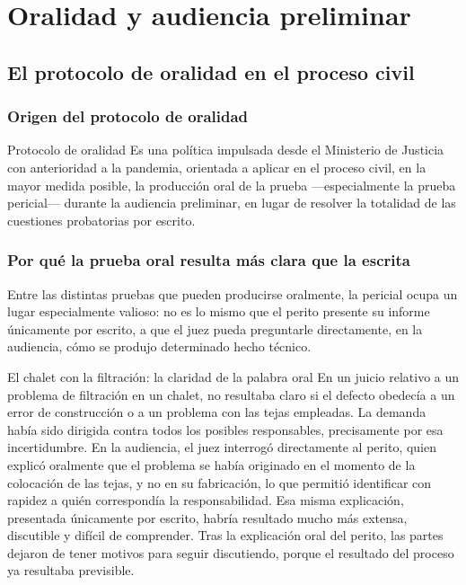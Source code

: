 \documentclass[12pt,oneside]{book}
\begin{document}
\chapter{Oralidad y audiencia preliminar}

\section{El protocolo de oralidad en el proceso civil}

\subsection{Origen del protocolo de oralidad}

\begin{definition}{Protocolo de oralidad}
Es una política impulsada desde el Ministerio de Justicia con anterioridad a la pandemia, orientada a aplicar en el proceso civil, en la mayor medida posible, la producción oral de la prueba —especialmente la prueba pericial— durante la audiencia preliminar, en lugar de resolver la totalidad de las cuestiones probatorias por escrito.
\end{definition}

\subsection{Por qué la prueba oral resulta más clara que la escrita}

Entre las distintas pruebas que pueden producirse oralmente, la pericial ocupa un lugar especialmente valioso: no es lo mismo que el perito presente su informe únicamente por escrito, a que el juez pueda preguntarle directamente, en la audiencia, cómo se produjo determinado hecho técnico.

\begin{example}{El chalet con la filtración: la claridad de la palabra oral}
En un juicio relativo a un problema de filtración en un chalet, no resultaba claro si el defecto obedecía a un error de construcción o a un problema con las tejas empleadas. La demanda había sido dirigida contra todos los posibles responsables, precisamente por esa incertidumbre. En la audiencia, el juez interrogó directamente al perito, quien explicó oralmente que el problema se había originado en el momento de la colocación de las tejas, y no en su fabricación, lo que permitió identificar con rapidez a quién correspondía la responsabilidad. Esa misma explicación, presentada únicamente por escrito, habría resultado mucho más extensa, discutible y difícil de comprender. Tras la explicación oral del perito, las partes dejaron de tener motivos para seguir discutiendo, porque el resultado del proceso ya resultaba previsible.
\end{example}
\end{document}
